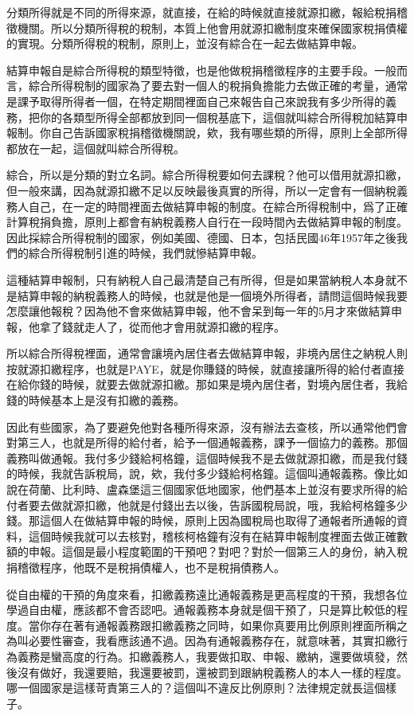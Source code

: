 \documentclass[]{ctexbook}
\begin{document}
分類所得就是不同的所得來源，就直接，在給的時候就直接就源扣繳，報給稅捐稽徵機關。所以分類所得稅的稅制，本質上他會用就源扣繳制度來確保國家稅捐債權的實現。分類所得稅的稅制，原則上，並沒有綜合在一起去做結算申報。

結算申報自是綜合所得稅的類型特徵，也是他做稅捐稽徵程序的主要手段。一般而言，綜合所得稅制的國家為了要去對一個人的稅捐負擔能力去做正確的考量，通常是課予取得所得者一個，在特定期間裡面自己來報告自己來說我有多少所得的義務，把你的各類型所得全部都放到同一個稅基底下，這個就叫綜合所得稅加結算申報制。你自己告訴國家稅捐稽徵機關說，欸，我有哪些類的所得，原則上全部所得都放在一起，這個就叫綜合所得稅。

綜合，所以是分類的對立名詞。綜合所得稅要如何去課稅？他可以借用就源扣繳，但一般來講，因為就源扣繳不足以反映最後真實的所得，所以一定會有一個納稅義務人自己，在一定的時間裡面去做結算申報的制度。在綜合所得稅制中，爲了正確計算稅捐負擔，原則上都會有納稅義務人自行在一段時間內去做結算申報的制度。因此採綜合所得稅制的國家，例如美國、德國、日本，包括民國46年1957年之後我們的綜合所得稅制引進的時候，我們就慘結算申報。

這種結算申報制，只有納稅人自己最清楚自己有所得，但是如果當納稅人本身就不是結算申報的納稅義務人的時候，也就是他是一個境外所得者，請問這個時候我要怎麼讓他報稅？因為他不會來做結算申報，他不會呆到每一年的5月才來做結算申報，他拿了錢就走人了，從而他才會用就源扣繳的程序。

所以綜合所得稅裡面，通常會讓境內居住者去做結算申報，非境內居住之納稅人則按就源扣繳程序，也就是PAYE，就是你賺錢的時候，就直接讓所得的給付者直接在給你錢的時候，就要去做就源扣繳。那如果是境內居住者，對境內居住者，我給錢的時候基本上是沒有扣繳的義務。

因此有些國家，為了要避免他對各種所得來源，沒有辦法去查核，所以通常他們會對第三人，也就是所得的給付者，給予一個通報義務，課予一個協力的義務。那個義務叫做通報。我付多少錢給柯格鐘，這個時候我不是去做就源扣繳，而是我付錢的時候，我就告訴稅局，說，欸，我付多少錢給柯格鐘。這個叫通報義務。像比如說在荷蘭、比利時、盧森堡這三個國家低地國家，他們基本上並沒有要求所得的給付者要去做就源扣繳，他就是付錢出去以後，告訴國稅局說，哦，我給柯格鐘多少錢。那這個人在做結算申報的時候，原則上因為國稅局也取得了通報者所通報的資料，這個時候我就可以去核對，稽核柯格鐘有沒有在結算申報制度裡面去做正確數額的申報。這個是最小程度範圍的干預吧？對吧？對於一個第三人的身份，納入稅捐稽徵程序，他既不是稅捐債權人，也不是稅捐債務人。

從自由權的干預的角度來看，扣繳義務遠比通報義務是更高程度的干預，我想各位學過自由權，應該都不會否認吧。通報義務本身就是個干預了，只是算比較低的程度。當你存在著有通報義務跟扣繳義務之同時，如果你真要用比例原則裡面所稱之為叫必要性審查，我看應該通不過。因為有通報義務存在，就意味著，其實扣繳行為義務是蠻高度的行為。扣繳義務人，我要做扣取、申報、繳納，還要做填發，然後沒有做好，我還要賠，我還要被罰，還被罰到跟納稅義務人的本人一樣的程度。哪一個國家是這樣苛責第三人的？這個叫不違反比例原則？法律規定就長這個樣子。
\end{document}
